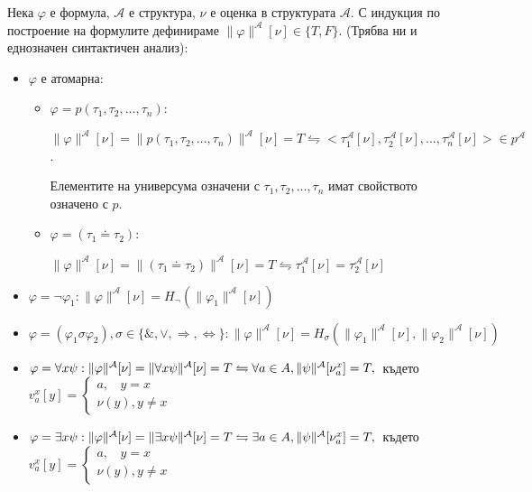 \documentclass{article}
\begin{document}
\begin{mydef}
Нека $\varphi$ е формула, $\mathcal{A}$ е структура, $\nu$ е оценка в структурата $\mathcal{A}$. С индукция по построение на формулите дефинираме $\|\varphi\|^\mathcal{A}[\nu] \in \{T, F\}$. (Трябва ни и еднозначен синтактичен анализ):

\begin{itemize}
\item $\varphi$ е атомарна:
\begin{itemize}
\item $\varphi = p(\tau_1, \tau_2, \ldots, \tau_n)$: 

$\|\varphi\|^\mathcal{A}[\nu] = \|p(\tau_1, \tau_2, \ldots, \tau_n)\|^\mathcal{A}[\nu] = T \leftrightharpoons <\tau_1^\mathcal{A}[\nu], \tau_2^\mathcal{A}[\nu], \ldots, \tau_n^\mathcal{A}[\nu]> \in p^\mathcal{A}$. 

Елементите на универсума означени с $\tau_1, \tau_2, \ldots, \tau_n$ имат свойството означено с $p$.

\item $\varphi = (\tau_1 \doteq \tau_2)$:

$\|\varphi\|^\mathcal{A}[\nu] = \|(\tau_1 \doteq \tau_2)\|^\mathcal{A}[\nu] = T \leftrightharpoons \tau_1^\mathcal{A}[\nu] = \tau_2^\mathcal{A}[\nu]$
\end{itemize}
\item $\varphi = \neg\varphi_1: \|\varphi\|^\mathcal{A}[\nu] = H_\neg(\|\varphi_1\|^\mathcal{A}[\nu])$
\item $\varphi = (\varphi_1 \sigma \varphi_2), \sigma \in \{\&,\lor, \Rightarrow, \Leftrightarrow \}: \|\varphi\|^\mathcal{A}[\nu] = H_\sigma(\|\varphi_1\|^\mathcal{A}[\nu], \|\varphi_2\|^\mathcal{A}[\nu])$
\item $\varphi = \forall x\psi: \|\varphi\|^\mathcal{A}[\nu] = \|\forall x\psi\|^\mathcal{A}[\nu] = T \leftrightharpoons \forall a \in A, \|\psi\|^\mathcal{A}[\nu_a^x] = T, \\ $ където $v_a^x[y] = \begin{cases}
a, \ \ \ \ y = x\\
\nu(y), y \neq x
\end{cases} $
\item $\varphi = \exists x \psi: \|\varphi\|^\mathcal{A}[\nu] = \|\exists x\psi\|^\mathcal{A}[\nu] = T \leftrightharpoons \exists a \in A, \|\psi\|^\mathcal{A}[\nu_a^x] = T, \\ $ където $v_a^x[y] = \begin{cases}
a, \ \ \ \ y = x\\
\nu(y), y \neq x
\end{cases} $
\end{itemize}


\end{mydef}
\end{document}
